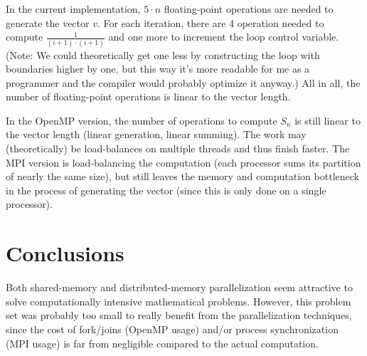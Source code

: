 \documentclass[12pt]{simple-assignment} %
\begin{document}
In the current implementation, $5 \cdot n$ floating-point operations are needed to generate the vector $v$. For each iteration, there are 4 operation needed to compute $\frac{1}{(i+1) \cdot (i+1)}$ and one more to increment the loop control variable. (Note: We could theoretically get one less by constructing the loop with boundaries higher by one, but this way it's more readable for me as a programmer and the compiler would probably optimize it anyway.) All in all, the number of floating-point operations is linear to the vector length.

In the OpenMP version, the number of operations to compute $S_n$ is still linear to the vector length (linear generation, linear summing). The work may (theoretically) be load-balances on multiple threads and thus finish faster. The MPI version is load-balancing the computation (each processor sums its partition of nearly the same size), but still leaves the memory and computation bottleneck in the process of generating the vector (since this is only done on a single processor).

\section{Conclusions}
Both shared-memory and distributed-memory parallelization seem attractive to solve computationally intensive mathematical problems. However, this problem set was probably too small to really benefit from the parallelization techniques, since the cost of fork/joins (OpenMP usage) and/or process synchronization (MPI usage) is far from negligible compared to the actual computation.
\end{document}
